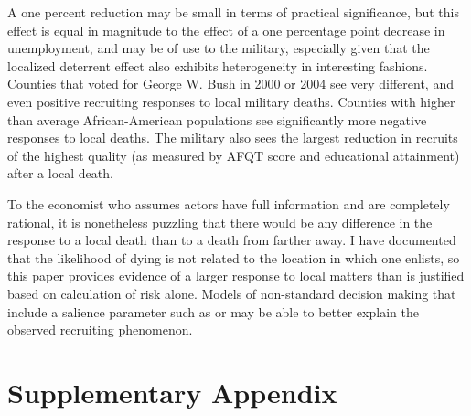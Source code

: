 \documentclass[12pt] {article}
\begin{document}
A one percent reduction may be small in terms of practical significance, but this effect is equal in magnitude to the effect of a one percentage point decrease in unemployment, and may be of use to the military, especially given that the localized deterrent effect also exhibits heterogeneity in interesting fashions. Counties that voted for George W. Bush in 2000 or 2004 see very different, and even positive recruiting responses
to local military deaths. Counties with higher than average African-American
populations see significantly more negative responses to local deaths. The military
also sees the largest reduction in recruits of the highest quality
(as measured by AFQT score and educational attainment) after a local
death. %

To the economist who assumes actors have full information and are completely rational, it is nonetheless puzzling that there would be any difference in the response to a local death than to a death from farther away. I have documented that the likelihood of dying is not related to the location in which one enlists, so this paper provides evidence of
a larger response to local matters than is justified based on calculation
of risk alone. Models of non-standard decision making that include
a salience parameter such as \cite{ChettySalience} or \cite{eBayEarly}
may be able to better explain the observed recruiting phenomenon. 




\newpage



\newpage
\appendix

\section{Supplementary Appendix}
\setcounter{table}{0}
\renewcommand{\thetable}{A\arabic{table}}
\end{document}
